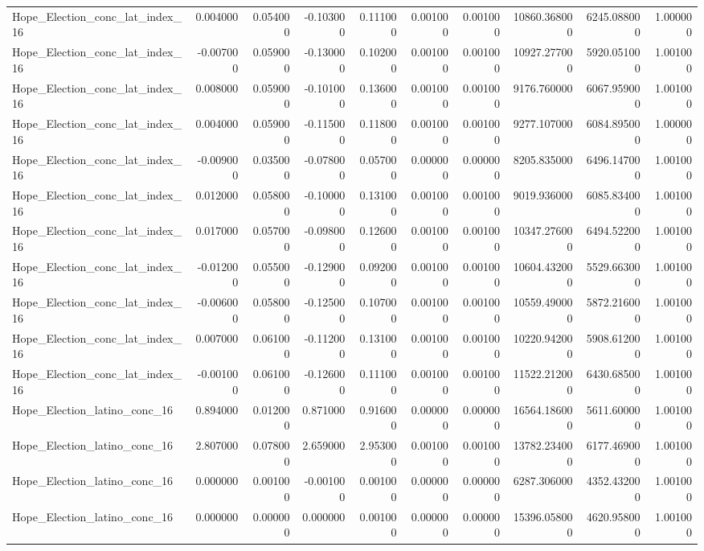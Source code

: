 \begin{table}
\begin{tabular}{lrrrrrrrrr}
Hope_Election_conc_lat_index_16 & 0.004000 & 0.054000 & -0.103000 & 0.111000 & 0.001000 & 0.001000 & 10860.368000 & 6245.088000 & 1.000000 \\
Hope_Election_conc_lat_index_16 & -0.007000 & 0.059000 & -0.130000 & 0.102000 & 0.001000 & 0.001000 & 10927.277000 & 5920.051000 & 1.001000 \\
Hope_Election_conc_lat_index_16 & 0.008000 & 0.059000 & -0.101000 & 0.136000 & 0.001000 & 0.001000 & 9176.760000 & 6067.959000 & 1.001000 \\
Hope_Election_conc_lat_index_16 & 0.004000 & 0.059000 & -0.115000 & 0.118000 & 0.001000 & 0.001000 & 9277.107000 & 6084.895000 & 1.000000 \\
Hope_Election_conc_lat_index_16 & -0.009000 & 0.035000 & -0.078000 & 0.057000 & 0.000000 & 0.000000 & 8205.835000 & 6496.147000 & 1.001000 \\
Hope_Election_conc_lat_index_16 & 0.012000 & 0.058000 & -0.100000 & 0.131000 & 0.001000 & 0.001000 & 9019.936000 & 6085.834000 & 1.001000 \\
Hope_Election_conc_lat_index_16 & 0.017000 & 0.057000 & -0.098000 & 0.126000 & 0.001000 & 0.001000 & 10347.276000 & 6494.522000 & 1.001000 \\
Hope_Election_conc_lat_index_16 & -0.012000 & 0.055000 & -0.129000 & 0.092000 & 0.001000 & 0.001000 & 10604.432000 & 5529.663000 & 1.001000 \\
Hope_Election_conc_lat_index_16 & -0.006000 & 0.058000 & -0.125000 & 0.107000 & 0.001000 & 0.001000 & 10559.490000 & 5872.216000 & 1.001000 \\
Hope_Election_conc_lat_index_16 & 0.007000 & 0.061000 & -0.112000 & 0.131000 & 0.001000 & 0.001000 & 10220.942000 & 5908.612000 & 1.001000 \\
Hope_Election_conc_lat_index_16 & -0.001000 & 0.061000 & -0.126000 & 0.111000 & 0.001000 & 0.001000 & 11522.212000 & 6430.685000 & 1.001000 \\
Hope_Election_latino_conc_16 & 0.894000 & 0.012000 & 0.871000 & 0.916000 & 0.000000 & 0.000000 & 16564.186000 & 5611.600000 & 1.001000 \\
Hope_Election_latino_conc_16 & 2.807000 & 0.078000 & 2.659000 & 2.953000 & 0.001000 & 0.001000 & 13782.234000 & 6177.469000 & 1.001000 \\
Hope_Election_latino_conc_16 & 0.000000 & 0.001000 & -0.001000 & 0.001000 & 0.000000 & 0.000000 & 6287.306000 & 4352.432000 & 1.001000 \\
Hope_Election_latino_conc_16 & 0.000000 & 0.000000 & 0.000000 & 0.001000 & 0.000000 & 0.000000 & 15396.058000 & 4620.958000 & 1.001000 \\

\end{tabular}
\end{table}
